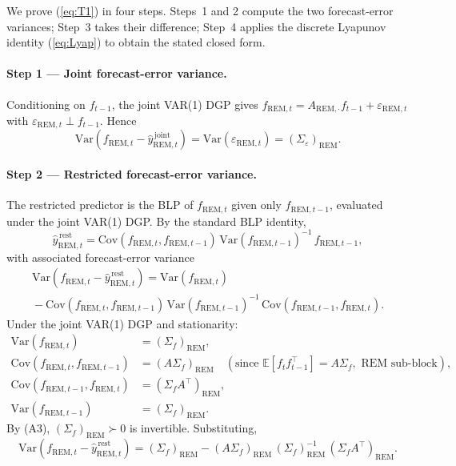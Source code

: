 \documentclass[11pt,letterpaper]{article}
\theoremstyle{remark}
\newcommand{\REM}{\mathrm{REM}}
\newcommand{\Sigmaf}{\Sigma_f}
\newcommand{\Sigmae}{\Sigma_\varepsilon}
\newcommand{\Var}{\mathrm{Var}}
\newcommand{\Cov}{\mathrm{Cov}}
\newcommand{\E}{\mathbb{E}}
\begin{document}
We prove (\ref{eq:T1}) in four steps. Steps~1 and 2 compute the two forecast-error variances; Step~3 takes their difference; Step~4 applies the discrete Lyapunov identity (\ref{eq:Lyap}) to obtain the stated closed form.

\paragraph{Step 1 --- Joint forecast-error variance.} Conditioning on $f_{t-1}$, the joint VAR(1) DGP gives $f_{\REM, t} = A_{\REM, \cdot} f_{t-1} + \varepsilon_{\REM, t}$ with $\varepsilon_{\REM, t} \perp f_{t-1}$. Hence
\begin{equation}\label{eq:appA-1}
\Var\!\left(f_{\REM, t} - \widehat{y}^{\,\mathrm{joint}}_{\REM, t}\right) = \Var(\varepsilon_{\REM, t}) = (\Sigmae)_\REM.
\end{equation}

\paragraph{Step 2 --- Restricted forecast-error variance.} The restricted predictor is the BLP of $f_{\REM, t}$ given only $f_{\REM, t-1}$, evaluated under the joint VAR(1) DGP. By the standard BLP identity,
\begin{equation*}
\widehat{y}^{\,\mathrm{rest}}_{\REM, t} = \Cov(f_{\REM, t}, f_{\REM, t-1}) \, \Var(f_{\REM, t-1})^{-1} \, f_{\REM, t-1},
\end{equation*}
with associated forecast-error variance
\begin{multline*}
\Var\!\left(f_{\REM, t} - \widehat{y}^{\,\mathrm{rest}}_{\REM, t}\right) = \Var(f_{\REM, t}) \\
{} - \Cov(f_{\REM, t}, f_{\REM, t-1}) \, \Var(f_{\REM, t-1})^{-1} \, \Cov(f_{\REM, t-1}, f_{\REM, t}).
\end{multline*}
Under the joint VAR(1) DGP and stationarity:
\begin{align*}
\Var(f_{\REM, t}) &= (\Sigmaf)_\REM, \\
\Cov(f_{\REM, t}, f_{\REM, t-1}) &= (A \Sigmaf)_\REM \quad (\text{since } \E[f_t f_{t-1}^\top] = A \Sigmaf, \text{ REM sub-block}), \\
\Cov(f_{\REM, t-1}, f_{\REM, t}) &= (\Sigmaf A^\top)_\REM, \\
\Var(f_{\REM, t-1}) &= (\Sigmaf)_\REM.
\end{align*}
By (A3), $(\Sigmaf)_\REM \succ 0$ is invertible. Substituting,
\begin{equation}\label{eq:appA-2}
\Var\!\left(f_{\REM, t} - \widehat{y}^{\,\mathrm{rest}}_{\REM, t}\right) = (\Sigmaf)_\REM - (A \Sigmaf)_\REM \, (\Sigmaf)_\REM^{-1} \, (\Sigmaf A^\top)_\REM.
\end{equation}
\end{document}
